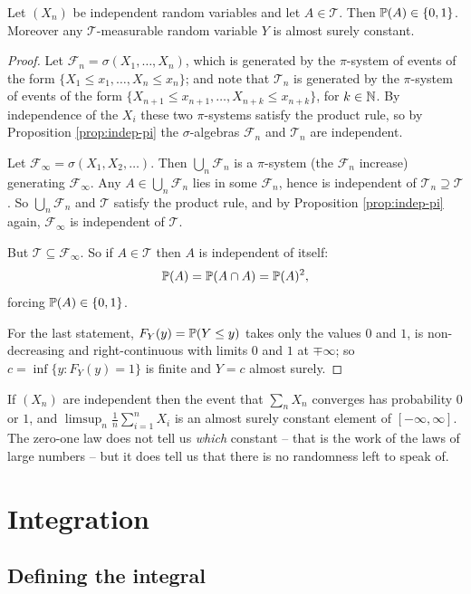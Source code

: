 \documentclass[a4paper]{scrartcl}
\newcommand{\cF}{\mathcal{F}}
\newcommand{\cT}{\mathcal{T}}
\begin{document}
\begin{theorem}\label{thm:kolmogorov01}
	Let $(X_n)$ be independent random variables and let $A \in \cT$. Then $\mathbb{P}(A) \in \{0,1\}$. Moreover any $\cT$-measurable random variable $Y$ is almost surely constant.
\end{theorem}
\begin{proof}
	Let $\cF_n = \sigma(X_1,\dots,X_n)$, which is generated by the $\pi$-system of events of the form $\{X_1 \leq x_1, \dots, X_n\leq x_n\}$; and note that $\cT_n$ is generated by the $\pi$-system of events of the form $\{X_{n+1}\leq x_{n+1},\dots,X_{n+k}\leq x_{n+k}\}$, for $k \in \mathbb{N}$. By independence of the $X_i$ these two $\pi$-systems satisfy the product rule, so by Proposition \ref{prop:indep-pi} the $\sigma$-algebras $\cF_n$ and $\cT_n$ are independent.

	Let $\cF_\infty = \sigma(X_1, X_2, \dots)$. Then $\bigcup_n \cF_n$ is a $\pi$-system (the $\cF_n$ increase) generating $\cF_\infty$. Any $A \in \bigcup_n \cF_n$ lies in some $\cF_n$, hence is independent of $\cT_n \supseteq \cT$. So $\bigcup_n \cF_n$ and $\cT$ satisfy the product rule, and by Proposition \ref{prop:indep-pi} again, $\cF_\infty$ is independent of $\cT$.

	But $\cT \subseteq \cF_\infty$. So if $A \in \cT$ then $A$ is independent of itself:
	$$
	\mathbb{P}(A) = \mathbb{P}(A \cap A) = \mathbb{P}(A)^2,
	$$
	forcing $\mathbb{P}(A) \in \{0,1\}$.

	For the last statement, $F_Y(y) = \mathbb{P}(Y \leq y)$ takes only the values $0$ and $1$, is non-decreasing and right-continuous with limits $0$ and $1$ at $\mp\infty$; so $c = \inf\{y : F_Y(y) = 1\}$ is finite and $Y = c$ almost surely.
\end{proof}

\begin{example}
	If $(X_n)$ are independent then the event that $\sum_n X_n$ converges has probability $0$ or $1$, and $\limsup_n \frac1n \sum_{i=1}^n X_i$ is an almost surely constant element of $[-\infty,\infty]$. The zero-one law does not tell us \emph{which} constant -- that is the work of the laws of large numbers -- but it does tell us that there is no randomness left to speak of.
\end{example}
\section{Integration}

\subsection{Defining the integral}
\end{document}
